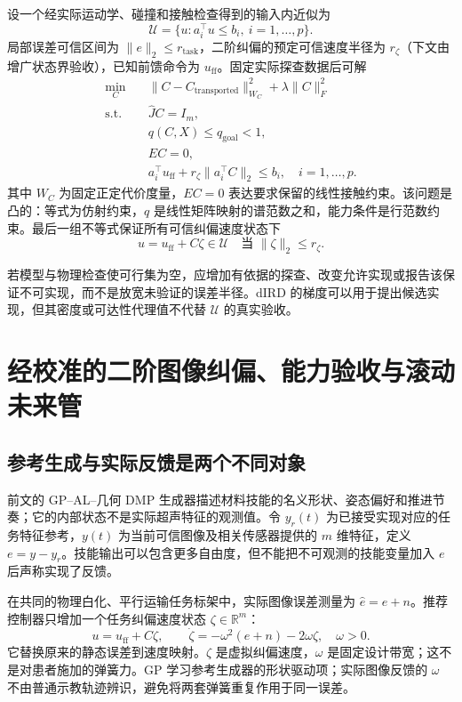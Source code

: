 \documentclass[11pt,a4paper]{article}
\numberwithin{equation}{section}
\theoremstyle{definition}
\newcommand{\R}{\mathbb R}
\begin{document}
设一个经实际运动学、碰撞和接触检查得到的输入内近似为
\begin{equation}
  \mathcal U=
  \{u:a_i^\top u\le b_i,\ i=1,\ldots,p\}.
\end{equation}
局部误差可信区间为 $\|e\|_2\le r_{\mathrm{task}}$，二阶纠偏的预定可信速度半径为 $r_\zeta$（下文由增广状态界验收），已知前馈命令为 $u_{\mathrm{ff}}$。固定实际探查数据后可解
\begin{equation}
\begin{aligned}
  \min_C\quad&
  \|C-C_{\mathrm{transported}}\|_{W_C}^2+
  \lambda\|C\|_F^2\\
  \text{s.t.}\quad&
  \widehat JC=I_m,\\
  &q(C,X)\le q_{\mathrm{goal}}<1,\\
  &EC=0,\\
  &a_i^\top u_{\mathrm{ff}}
   +r_\zeta\|a_i^\top C\|_2
   \le b_i,\quad i=1,\ldots,p.
\end{aligned}
\label{eq:cal-convex-repair}
\end{equation}
其中 $W_C$ 为固定正定代价度量，$EC=0$ 表达要求保留的线性接触约束。该问题是凸的：等式为仿射约束，$q$ 是线性矩阵映射的谱范数之和，能力条件是行范数约束。最后一组不等式保证所有可信纠偏速度状态下
\begin{equation}
  u=u_{\mathrm{ff}}+C\zeta\in\mathcal U\quad\text{当 }\|\zeta\|_2\le r_\zeta .
\end{equation}

若模型与物理检查使可行集为空，应增加有依据的探查、改变允许实现或报告该保证不可实现，而不是放宽未验证的误差半径。dIRD 的梯度可以用于提出候选实现，但其密度或可达性代理值不代替 $\mathcal U$ 的真实验收。

\section{经校准的二阶图像纠偏、能力验收与滚动未来管}
\label{sec:cal-recovery}

\subsection{参考生成与实际反馈是两个不同对象}

前文的 GP--AL--几何 DMP 生成器描述材料技能的名义形状、姿态偏好和推进节奏；它的内部状态不是实际超声特征的观测值。令 $y_r(t)$ 为已接受实现对应的任务特征参考，$y(t)$ 为当前可信图像及相关传感器提供的 $m$ 维特征，定义 $e=y-y_r$。技能输出可以包含更多自由度，但不能把不可观测的技能变量加入 $e$ 后声称实现了反馈。

在共同的物理白化、平行运输任务标架中，实际图像误差测量为 $\widehat e=e+n$。推荐控制器只增加一个任务纠偏速度状态 $\zeta\in\R^m$：
\begin{equation}
 \boxed{u=u_{\mathrm{ff}}+C\zeta,\qquad
 \dot\zeta=-\omega^2(e+n)-2\omega\zeta,\quad \omega>0.}
 \label{eq:cal-servo-second-order}
\end{equation}
它替换原来的静态误差到速度映射。$\zeta$ 是虚拟纠偏速度，$\omega$ 是固定设计带宽；这不是对患者施加的弹簧力。GP 学习参考生成器的形状驱动项；实际图像反馈的 $\omega$ 不由普通示教轨迹辨识，避免将两套弹簧重复作用于同一误差。
\end{document}
